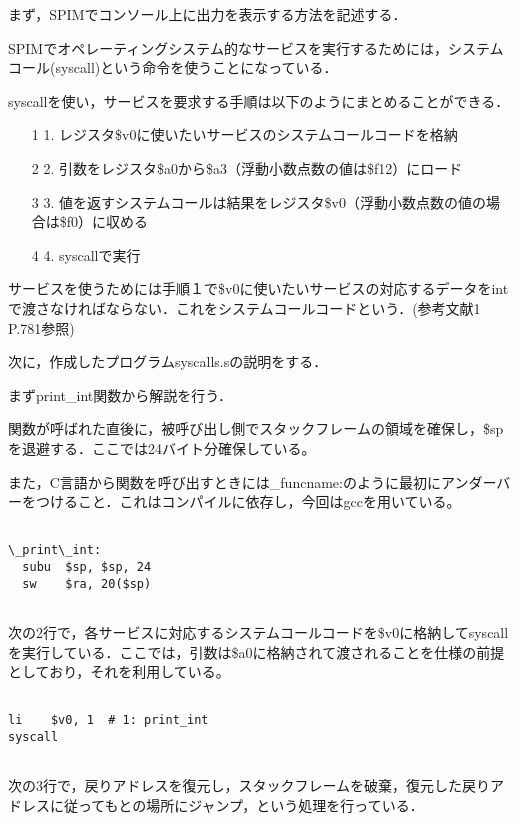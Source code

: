 \documentclass[a4j]{jarticle}
\begin{document}
まず，SPIMでコンソール上に出力を表示する方法を記述する．

SPIMでオペレーティングシステム的なサービスを実行するためには，システムコール(syscall)という命令を使うことになっている．

syscallを使い，サービスを要求する手順は以下のようにまとめることができる．

\begin{itemize}
\item[1]1. レジスタ\$v0に使いたいサービスのシステムコールコードを格納
\item[2]2. 引数をレジスタ\$a0から\$a3（浮動小数点数の値は\$f12）にロード
\item[3]3. 値を返すシステムコールは結果をレジスタ\$v0（浮動小数点数の値の場合は\$f0）に収める
\item[4]4. syscallで実行
\end{itemize}

サービスを使うためには手順１で\$v0に使いたいサービスの対応するデータをintで渡さなければならない．これをシステムコールコードという．(参考文献1 P.781参照)


次に，作成したプログラムsyscalls.sの説明をする．

まずprint\_int関数から解説を行う．


関数が呼ばれた直後に，被呼び出し側でスタックフレームの領域を確保し，\$spを退避する．ここでは24バイト分確保している。

また，C言語から関数を呼び出すときには\_funcname:のように最初にアンダーバーをつけること．これはコンパイルに依存し，今回はgccを用いている。　

{\baselineskip 3mm
\begin{verbatim}

\_print\_int:
  subu  $sp, $sp, 24
  sw    $ra, 20($sp)
 
\end{verbatim}
}

次の2行で，各サービスに対応するシステムコールコードを\$v0に格納してsyscallを実行している．ここでは，引数は\$a0に格納されて渡されることを仕様の前提としており，それを利用している。

{\baselineskip 3mm
\begin{verbatim}

li    $v0, 1  # 1: print_int
syscall
 
\end{verbatim}
}

次の3行で，戻りアドレスを復元し，スタックフレームを破棄，復元した戻りアドレスに従ってもとの場所にジャンプ，という処理を行っている．
\end{document}

